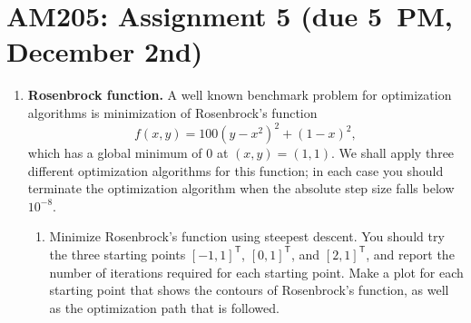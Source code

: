 \documentclass[11pt]{article}
\newcommand{\Trans}{\mathsf{T}}
\begin{document}
\section*{AM205: Assignment 5 (due 5~PM, December 2nd)}
\begin{enumerate}
  \item \textbf{Rosenbrock function.} A well known benchmark problem for
    optimization algorithms is minimization of Rosenbrock's function
    \begin{equation}
      f(x,y) = 100(y-x^2)^2 + (1-x)^2,
    \end{equation}
    which has a global minimum of $0$ at $(x,y) = (1,1)$. We shall apply three
    different optimization algorithms for this function; in each case you
    should terminate the optimization algorithm when the absolute step
    size falls below $10^{-8}$.
    \begin{enumerate}
      \item Minimize Rosenbrock's function using steepest descent. You should
	try the three starting points $[-1,1]^\Trans$, $[0,1]^\Trans$, and
	$[2,1]^\Trans$, and report the number of iterations required for each
	starting point. Make a plot for each starting point that shows the
	contours of Rosenbrock's function, as well as the optimization path
	that is followed.


\end{enumerate}
\end{enumerate}
\end{document}
